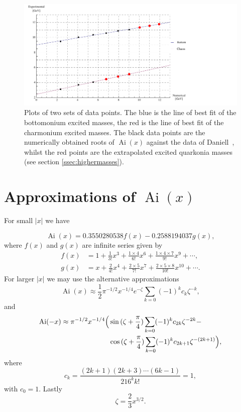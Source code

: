 \documentclass[]{article}
\renewcommand{\mod}[1]{\ensuremath{\lvert {#1} \rvert}}
\newcommand{\Ai}[1]{\ensuremath{\operatorname{Ai}({#1})}}
\begin{document}
\begin{figure}[H]
	\hspace*{-0.15\textwidth}
	\centering
	\includegraphics[scale=1.3]{experimental-numerical}
	\caption{Plots of two sets of data points. The blue is the line of best fit of the bottomonium excited masses, the red is the line of best fit of the charmonium excited masses. The black data points are the numerically obtained roots of \Ai{x} against the data of Daniell~\cite{ref:gdaniell}, whilst the red points are the extrapolated excited quarkonia masses (see section \ref{ssec:highermasses}).}
	\label{fig:data}
\end{figure}


\appendix
\section{Approximations of \Ai{x}}\label{app:approximations}

For small $\mod{x}$ we have

\[\Ai{x} = 0.3550280538f(x) - 0.2588194037g(x),\]
where $f(x)$ and $g(x)$ are infinite series given by
\begin{align}
f(x) &= 1 + \frac{1}{3!}x^{3} + \frac{1\times4}{6!}x^{6} + \frac{1\times4\times{7}}{9!}x^{9} + \dotsb,\label{eqn:airyfirstf}\\
g(x) &= x + \frac{2}{4!}x^{4} + \frac{2\times5}{7!}x^{7} + \frac{2\times5\times{8}}{10!}x^{10} + \dotsb\label{eqn:airyfirstg}.
\end{align}
For larger $\mod{x}$ we may use the alternative approximations
\[
\Ai{x} \approx \frac{1}{2}\pi^{-1/2}x^{-1/4}e^{-\zeta} \sum\limits_{k=0} (-1)^{k}c_{k}\zeta^{-k},
\]
and
\[
	\begin{split}
		\Ai{-x} \approx \pi^{-1/2}x^{-1/4}
		\Bigl(
			&\sin{(\zeta + \frac{\pi}{4})}\sum\limits_{k=0}(-1)^{k}c_{2k}\zeta^{-2k} -\\
			&\cos{(\zeta + \frac{\pi}{4})}\sum\limits_{k=0}(-1)^{k}c_{2k+1}\zeta^{-(2k+1)}
		\Bigr),
	\end{split}
\]
where
\begin{equation}\label{eqn:ck}
c_{k} = \frac{(2k+1)(2k+3)\dotsb(6k-1)}{216^{k}k!} = 1,
\end{equation}
with $c_{0} = 1$. Lastly
\[
\zeta = \frac{2}{3}x^{3/2}.
\]
\end{document}
